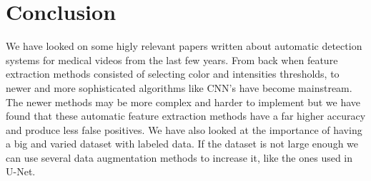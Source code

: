 \documentclass[english, a4paper]{article}
\begin{document}
\section{Conclusion} \label{conclusion}
We have looked on some higly relevant papers written about automatic detection systems for medical videos from the last few years. From back when feature extraction methods consisted of selecting color and intensities thresholds, to newer and more sophisticated algorithms like CNN's have become mainstream. The newer methods may be more complex and harder to implement but we have found that these automatic feature extraction methods have a far higher accuracy and produce less false positives. We have also looked at the importance of having a big and varied dataset with labeled data. If the dataset is not large enough we can use several data augmentation methods to increase it, like the ones used in U-Net. 



\newpage
\printbibliography
\end{document}
